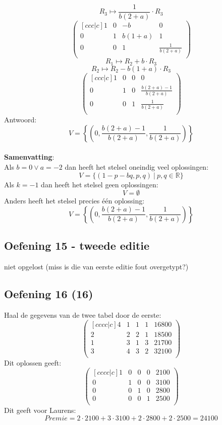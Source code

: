 \documentclass[lineaire_algebra_oplossingen.tex]{subfiles}
\begin{document}
\[ R_3 \longmapsto \frac{1}{b(2+a)}\cdot R_3 \]
\[
\begin{pmatrix}[ccc|c]
1 & 0 & -b & 0\\
0 & 1 & b(1+a) & 1\\
0 & 0 & 1 & \frac{1}{b(2+a)}\\
\end{pmatrix}
\]
\[ R_1 \longmapsto R_2 + b\cdot R_3 \]
\[ R_2 \longmapsto R_2 - b(1+a)\cdot R_3 \]
\[
\begin{pmatrix}[ccc|c]
1 & 0 & 0 & 0\\
0 & 1 & 0 & \frac{b(2+a)-1}{b(2+a)}\\
0 & 0 & 1 & \frac{1}{b(2+a)}\\
\end{pmatrix}
\]
Antwoord:
\[
V=\left\lbrace\left(0,\frac{b(2+a)-1}{b(2+a)}, \frac{1}{b(2+a)}\right)\right\rbrace
\]\\
\textbf{Samenvatting}:\\
Als  $b=0 \vee a=-2$ dan heeft het stelsel oneindig veel oplossingen:
\[
V = \{ (1-p-bq,p,q)\ |\ p,q \in \mathbb{R} \}
\]
Als $k=-1$ dan heeft het stelsel geen oplossingen:
\[
V=\emptyset
\]
Anders heeft het stelsel precies \'e\'en oplossing:
\[
V=\left\lbrace\left(0,\frac{b(2+a)-1}{b(2+a)}, \frac{1}{b(2+a)}\right)\right\rbrace
\]
\subsection{Oefening 15 - tweede editie}
niet opgelost (miss is die van eerste editie fout overgetypt?)

\subsection{Oefening 16 (16)}
Haal de gegevens van de twee tabel door de eerste:
\[
\begin{pmatrix}[cccc|c]
4 & 1 & 1 & 1 & 16800\\
2 & 2 & 2 & 1 & 18500\\
1 & 3 & 1 & 3 & 21700\\
3 & 4 & 3 & 2 & 32100\\
\end{pmatrix}
\]
Dit oplossen geeft:
\[
\begin{pmatrix}[cccc|c]
1 & 0 & 0 & 0 & 2100\\
0 & 1 & 0 & 0 & 3100\\
0 & 0 & 1 & 0 & 2800\\
0 & 0 & 0 & 1 & 2500\\
\end{pmatrix}
\]
Dit geeft voor Laurens:
\[
\textit{Premie} = 2\cdot 2100 + 3\cdot 3100 + 2\cdot 2800 + 2\cdot 2500 = 24100
\]
\end{document}
